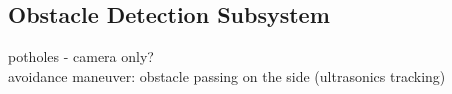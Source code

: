 \subsection{Obstacle Detection Subsystem}

\noindent potholes - camera only?\\

avoidance maneuver: obstacle passing on the side (ultrasonics tracking)\\


